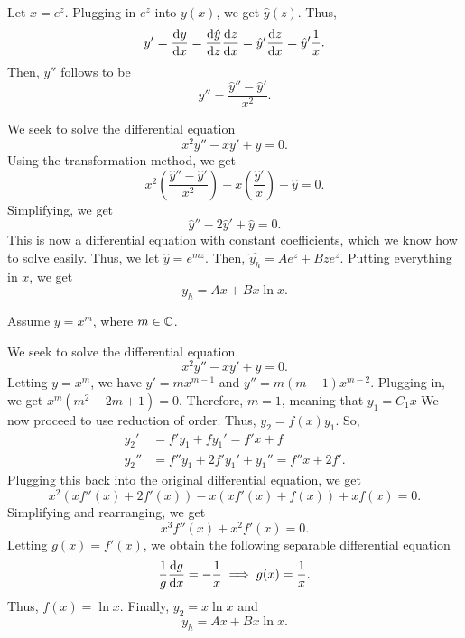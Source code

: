 \begin{theorem}
    Let $x = e^{z}$. Plugging in $e^z$ into $y(x)$, we get $\hat{y}(z)$.
    Thus, $$y' = \frac{\dif y}{\dif x} = \frac{\dif \hat{y}}{\dif z}\frac{\dif z}{\dif x} = 
    \hat{y}' \frac{\dif z}{\dif x} = \hat{y}' \frac{1}{x}.$$ Then, $y''$ follows
    to be $$y'' = \frac{\hat{y}''-\hat{y}'}{x^2}.$$
\end{theorem}
\begin{example}
    We seek to solve the differential equation $$x^2y''-xy'+y=0.$$
    Using the transformation method, we get
    $$x^2\left(\frac{\hat{y}''-\hat{y}'}{x^2}\right) 
    - x\left( \frac{\hat{y}'}{x}\right)+\hat{y} = 0.$$ Simplifying,
    we get $$\hat{y}''-2\hat{y}'+\hat{y} = 0.$$ This is now a differential
    equation with constant coefficients, which we know how to solve easily.
    Thus, we let $\hat{y} = e^{mz}$. Then, $\hat{y_h} = Ae^{z}+Bze^{z}$. Putting
    everything in $x$, we get $$y_h = Ax+Bx\ln x.$$
\end{example}
\begin{theorem}
    Assume $y=x^m$, where $m \in \mathbb C$.
\end{theorem}
\begin{example}
    We seek to solve the differential equation $$x^2y''-xy'+y = 0.$$
    Letting $y=x^m$, we have $y' = mx^{m-1}$ and $y'' = m(m-1)x^{m-2}$.
    Plugging in, we get $x^m\left(m^2-2m+1\right) = 0$. Therefore, $m=1$,
    meaning that $y_1 = C_1x$
    We now proceed to use reduction of order. Thus, $y_2 = f(x)y_1$.
    So, 
    \begin{align*}
        y_2' &= f'y_1+fy_1'=f'x+f \\
        y_2'' &= f''y_1+2f'y_1'+y_1''=f''x+2f'.
    \end{align*}
    Plugging this back into the original differential equation, we get
    $$x^2\left(xf''(x)+2f'(x)\right)-x\left(xf'(x)+f(x)\right)+xf(x) = 0.$$
    Simplifying and rearranging, we get $$x^3f''(x)+x^2f'(x) = 0.$$ Letting
    $g(x) = f'(x)$, we obtain the following separable differential equation
    $$\frac{1}{g} \frac{\dif g}{\dif x} = -\frac{1}{x} \implies g(x) = \frac{1}{x}.$$
    Thus, $f(x) = \ln x$. Finally, $y_2 = x \ln x$ and $$y_h = Ax+Bx\ln x.$$
\end{example}
 

